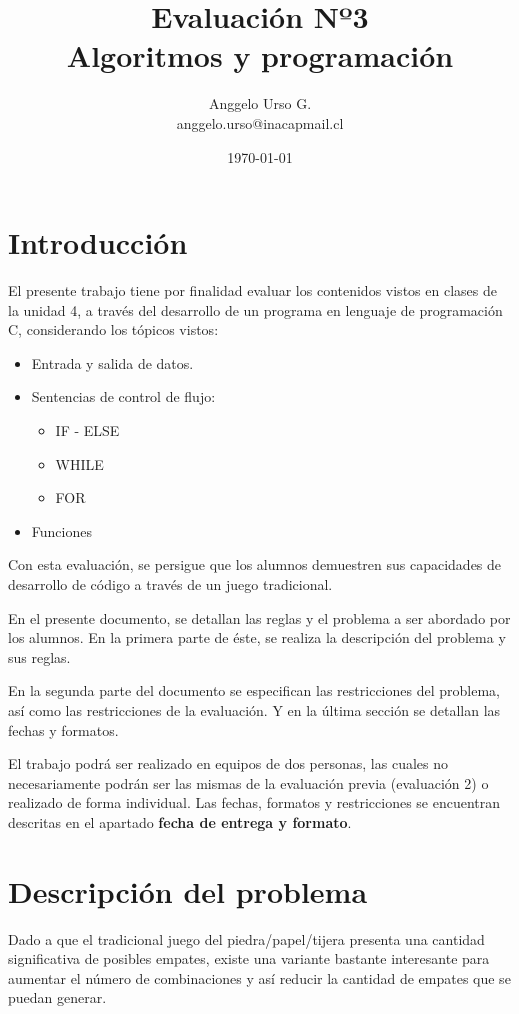 \documentclass[]{article}
\title{Evaluación Nº3 \protect\\ Algoritmos y programación}
\author{Anggelo Urso G. \\ anggelo.urso@inacapmail.cl}
\date{\today}
\begin{document}
    \thispagestyle{empty}
    \maketitle

    \section{Introducción}
    El presente trabajo tiene por finalidad evaluar los contenidos vistos en clases de la unidad 4, a través del desarrollo de un programa en lenguaje de programación C, considerando los tópicos vistos:

    \begin{itemize}
        \item Entrada y salida de datos.
        \item Sentencias de control de flujo:
        \begin{itemize}
            \item IF - ELSE
            \item WHILE
            \item FOR
        \end{itemize}
        \item Funciones
    \end{itemize}

    Con esta evaluación, se persigue que los alumnos demuestren sus capacidades de desarrollo de código a través de un juego tradicional.

    En el presente documento, se detallan las reglas y el problema a ser abordado por los alumnos. En la primera parte de éste, se realiza la descripción del problema y sus reglas.
    
    En la segunda parte del documento se especifican las restricciones del problema, así como las restricciones de la evaluación. Y en la última sección se detallan las fechas y formatos.

    El trabajo podrá ser realizado en equipos de dos personas, las cuales no necesariamente podrán ser las mismas de la evaluación previa (evaluación 2) o realizado de forma individual. Las fechas, formatos y restricciones se encuentran descritas en el apartado \textbf{fecha de entrega y formato}.

    \section{Descripción del problema}
    Dado a que el tradicional juego del piedra/papel/tijera presenta una cantidad significativa de posibles empates, existe una variante bastante interesante para aumentar el número de combinaciones y así reducir la cantidad de empates que se puedan generar.
\end{document}
